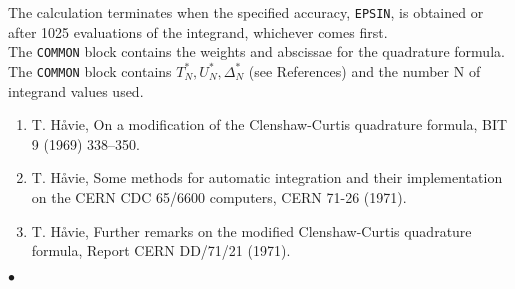 \Method
The calculation terminates when the
specified accuracy, {\tt EPSIN}, is obtained or after 1025 evaluations of
the integrand, whichever comes first. \\
The {\tt COMMON} block  contains the weights and
abscissae for the quadrature formula. \\
The {\tt COMMON} block  contains
$ T_N^*,U_N^*, \Delta_N^*$ (see References) and the number N of
integrand values used.
\newpage
\Refer
\begin{enumerate}
\item T. H\aa vie, On a modification of
the Clenshaw-Curtis quadrature formula, BIT 9 (1969) 338--350.
\item T. H\aa vie, Some methods for automatic integration
and their implementation on the CERN CDC 65/6600 computers, CERN
71-26 (1971).
\item T. H\aa vie, Further remarks on the modified
Clenshaw-Curtis quadrature formula, Report CERN DD/71/21 (1971).
\end{enumerate}
$\bullet$
